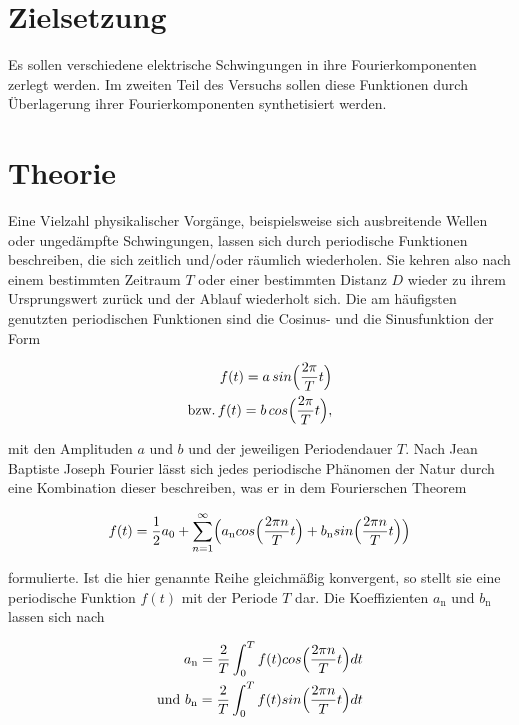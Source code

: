 \section{Zielsetzung}
\label{sec:Zielsetzung}
Es sollen verschiedene elektrische Schwingungen in ihre Fourierkomponenten zerlegt
werden. Im zweiten Teil des Versuchs sollen diese Funktionen durch 
Überlagerung ihrer Fourierkomponenten synthetisiert werden.


\section{Theorie}
\label{sec:Theorie}
Eine Vielzahl physikalischer Vorgänge, beispielsweise sich ausbreitende Wellen oder 
ungedämpfte Schwingungen, lassen sich durch periodische Funktionen beschreiben, die sich 
zeitlich und/oder räumlich wiederholen. Sie kehren also nach einem bestimmten Zeitraum $T$
oder einer bestimmten Distanz $D$ wieder zu ihrem Ursprungswert zurück und der Ablauf wiederholt sich.
Die am häufigsten genutzten periodischen Funktionen sind die Cosinus- und die Sinusfunktion der
Form

\begin{align}
f(t) = a \, sin \Bigl(\frac{2\pi}{T}t\Bigr) \\
\text{bzw.} \, f(t) = b \, cos \Bigl(\frac{2\pi}{T}t\Bigr),
\end{align}

mit den Amplituden $a$ und $b$ und der jeweiligen Periodendauer $T$. Nach Jean Baptiste Joseph Fourier 
lässt sich jedes periodische Phänomen der Natur durch eine Kombination dieser beschreiben,
was er in dem Fourierschen Theorem

\begin{align}
f(t) = \frac{1}{2} a_\text{0} + \sum_{n=1}^\infty \Bigl( a_\text{n} cos \Bigl( \frac{2 \pi n}{T} t \Bigr) + b_\text{n} sin \Bigl( \frac{2 \pi n}{T} t \Bigr) \Bigr)
\end{align}

formulierte. Ist die hier genannte Reihe gleichmäßig konvergent, so stellt sie eine periodische 
Funktion $f(t)$ mit der Periode $T$ dar. Die Koeffizienten $a_\text{n}$ und $b_\text{n}$ lassen sich 
nach

\begin{align}
a_\text{n} = \frac{2}{T} \int_0^T f(t) cos \Bigl( \frac{2 \pi n}{T} t \Bigr) dt \\
\text{und} \,\, b_\text{n} = \frac{2}{T} \int_0^T f(t) sin \Bigl( \frac{2 \pi n}{T} t \Bigr) dt
\end{align}

